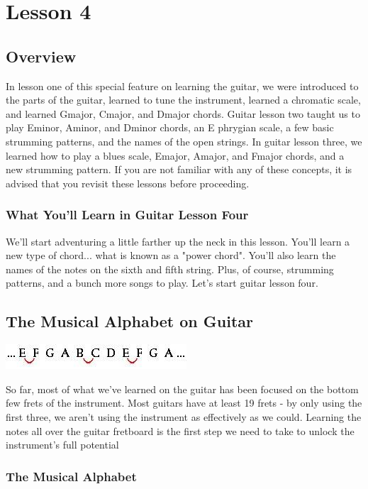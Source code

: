 \chapter{Lesson 4}
\section{Overview}
In lesson one of this special feature on learning the guitar, we were introduced to the parts of the guitar, learned to tune the instrument, learned a chromatic scale, and learned Gmajor, Cmajor, and Dmajor chords. Guitar lesson two taught us to play Eminor, Aminor, and Dminor chords, an E phrygian scale, a few basic strumming patterns, and the names of the open strings. In guitar lesson three, we learned how to play a blues scale, Emajor, Amajor, and Fmajor chords, and a new strumming pattern. If you are not familiar with any of these concepts, it is advised that you revisit these lessons before proceeding.

\subsection{What You'll Learn in Guitar Lesson Four}

We'll start adventuring a little farther up the neck in this lesson. You'll learn a new type of chord... what is known as a "power chord". You'll also learn the names of the notes on the sixth and fifth string. Plus, of course, strumming patterns, and a bunch more songs to play. Let's start guitar lesson four.

\section{The Musical Alphabet on Guitar}
\includegraphics{partfour/musalph.jpg}

So far, most of what we've learned on the guitar has been focused on the bottom few frets of the instrument. Most guitars have at least 19 frets - by only using the first three, we aren't using the instrument as effectively as we could. Learning the notes all over the guitar fretboard is the first step we need to take to unlock the instrument's full potential

\subsection{The Musical Alphabet}

